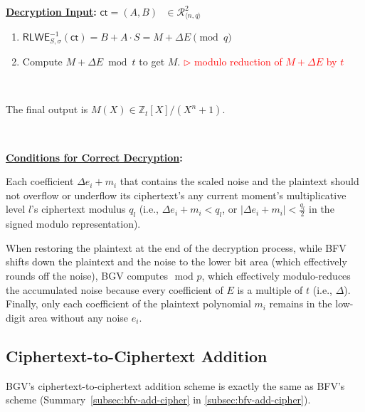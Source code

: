 \begin{tcolorbox}[title={\textbf{\tboxlabel{\ref*{subsec:bgv-enc-dec}} BGV Encryption and Decryption}}]
\textbf{\underline{Decryption Input}:} $\textsf{ct} = (A, B) \text{ } \in \mathcal{R}_{\langle n,q \rangle}^2$

\begin{enumerate}
\item $\textsf{RLWE}^{-1}_{S,\sigma}(\textsf{ct}) = B + A \cdot S  = M + \Delta E \pmod q$

\item Compute $M + \Delta E \bmod t$ to get $M$. \textcolor{red}{ $\rhd$ modulo reduction of $M + \Delta E$ by $t$}

\end{enumerate}

$ $

The final output is $M(X) \in \mathbb{Z}_t[X] / (X^n + 1)$.

$ $

\textbf{\underline{Conditions for Correct Decryption}:}

Each coefficient $\Delta e_i + m_i$ that contains the scaled noise and the plaintext should not overflow or underflow its ciphertext's any current moment's multiplicative level $l$'s ciphertext modulus $q_l$ (i.e., $\Delta e_i + m_i < q_l$, or $|\Delta e_i + m_i| < \frac{q_l}{2}$ in the signed modulo representation). 


\end{tcolorbox}

When restoring the plaintext at the end of the decryption process, while BFV shifts down the plaintext and the noise to the lower bit area (which effectively rounds off the noise), BGV computes $\text{ mod } p$, which effectively modulo-reduces the accumulated noise because every coefficient of $E$ is a multiple of $t$ (i.e., $\Delta$). Finally, only each coefficient of the plaintext polynomial $m_i$ remains in the low-digit area without any noise $e_i$. 



\subsection{Ciphertext-to-Ciphertext Addition}
\label{subsec:bgv-add-cipher}

BGV's ciphertext-to-ciphertext addition scheme is exactly the same as BFV's scheme (Summary~\ref*{subsec:bfv-add-cipher} in \autoref{subsec:bfv-add-cipher}). 


